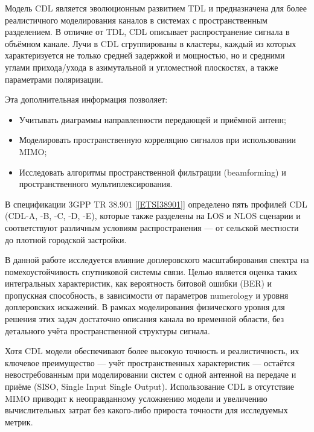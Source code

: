 Модель CDL является эволюционным развитием TDL и предназначена для более реалистичного
моделирования каналов в системах с пространственным разделением.
В отличие от TDL, CDL описывает распространение сигнала в объёмном канале. 
Лучи в CDL сгруппированы в кластеры, каждый из которых характеризуется не только средней задержкой 
и мощностью, но и средними углами прихода/ухода в азимутальной и угломестной плоскостях,
а также параметрами поляризации.

Эта дополнительная информация позволяет:
\begin{itemize}
\item Учитывать диаграммы направленности передающей и приёмной антенн;
\item Моделировать пространственную корреляцию сигналов при использовании MIMO;
\item Исследовать алгоритмы пространственной фильтрации (beamforming) и пространственного мультиплексирования.
\end{itemize}

В спецификации 3GPP TR 38.901 [\ref{ETSI38901}] определено пять профилей CDL (CDL-A, -B, -C, -D, -E),
которые также разделены на LOS и NLOS сценарии и соответствуют различным условиям распространения 
— от сельской местности до плотной городской застройки.

В данной работе исследуется влияние доплеровского масштабирования спектра на помехоустойчивость
спутниковой системы связи. Целью является оценка таких интегральных характеристик, 
как вероятность битовой ошибки (BER) и пропускная способность, в зависимости от параметров 
numerology и уровня доплеровских искажений. В рамках моделирования физического уровня для решения этих задач 
достаточно описания канала во временной области, без детального учёта пространственной структуры сигнала.

Хотя CDL модели обеспечивают более высокую точность и реалистичность,
их ключевое преимущество — учёт пространственных характеристик — 
остаётся невостребованным при моделировании систем с одной антенной на передаче и приёме (SISO, Single Input Single Output).
Использование CDL в отсутствие MIMO приводит к неоправданному усложнению модели и увеличению
вычислительных затрат без какого-либо прироста точности для исследуемых метрик.


